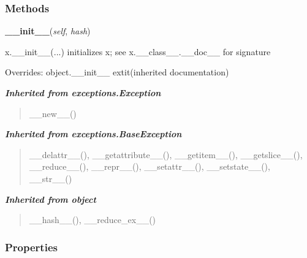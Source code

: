   \subsubsection{Methods}

    \vspace{0.5ex}

\hspace{.8\funcindent}\begin{boxedminipage}{\funcwidth}

    \raggedright \textbf{\_\_init\_\_}(\textit{self}, \textit{hash})

\setlength{\parskip}{2ex}
    x.\_\_init\_\_(...) initializes x; see x.\_\_class\_\_.\_\_doc\_\_ for 
    signature

\setlength{\parskip}{1ex}
      Overrides: object.\_\_init\_\_ 	extit{(inherited documentation)}

    \end{boxedminipage}


\large{\textbf{\textit{Inherited from exceptions.Exception}}}

\begin{quote}
\_\_new\_\_()
\end{quote}

\large{\textbf{\textit{Inherited from exceptions.BaseException}}}

\begin{quote}
\_\_delattr\_\_(), \_\_getattribute\_\_(), \_\_getitem\_\_(), \_\_getslice\_\_(), \_\_reduce\_\_(), \_\_repr\_\_(), \_\_setattr\_\_(), \_\_setstate\_\_(), \_\_str\_\_()
\end{quote}

\large{\textbf{\textit{Inherited from object}}}

\begin{quote}
\_\_hash\_\_(), \_\_reduce\_ex\_\_()
\end{quote}


  \subsubsection{Properties}


